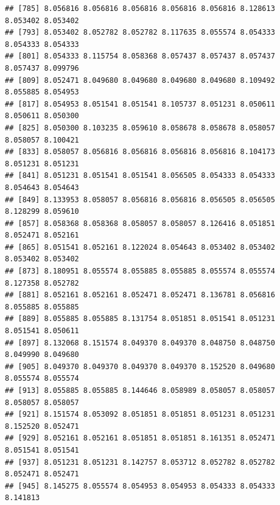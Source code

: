 \documentclass[
]{article}
\newenvironment{Shaded}{\begin{snugshade}}{\end{snugshade}}
\newcommand{\CommentTok}[1]{\textcolor[rgb]{0.56,0.35,0.01}{\textit{#1}}}
\newcommand{\DecValTok}[1]{\textcolor[rgb]{0.00,0.00,0.81}{#1}}
\newcommand{\FloatTok}[1]{\textcolor[rgb]{0.00,0.00,0.81}{#1}}
\newcommand{\FunctionTok}[1]{\textcolor[rgb]{0.00,0.00,0.00}{#1}}
\newcommand{\NormalTok}[1]{#1}
\newcommand{\OtherTok}[1]{\textcolor[rgb]{0.56,0.35,0.01}{#1}}
\newcommand{\SpecialCharTok}[1]{\textcolor[rgb]{0.00,0.00,0.00}{#1}}
\begin{document}
\begin{verbatim}
## [785] 8.056816 8.056816 8.056816 8.056816 8.056816 8.128613 8.053402 8.053402
## [793] 8.053402 8.052782 8.052782 8.117635 8.055574 8.054333 8.054333 8.054333
## [801] 8.054333 8.115754 8.058368 8.057437 8.057437 8.057437 8.057437 8.099796
## [809] 8.052471 8.049680 8.049680 8.049680 8.049680 8.109492 8.055885 8.054953
## [817] 8.054953 8.051541 8.051541 8.105737 8.051231 8.050611 8.050611 8.050300
## [825] 8.050300 8.103235 8.059610 8.058678 8.058678 8.058057 8.058057 8.100421
## [833] 8.058057 8.056816 8.056816 8.056816 8.056816 8.104173 8.051231 8.051231
## [841] 8.051231 8.051541 8.051541 8.056505 8.054333 8.054333 8.054643 8.054643
## [849] 8.133953 8.058057 8.056816 8.056816 8.056505 8.056505 8.128299 8.059610
## [857] 8.058368 8.058368 8.058057 8.058057 8.126416 8.051851 8.052471 8.052161
## [865] 8.051541 8.052161 8.122024 8.054643 8.053402 8.053402 8.053402 8.053402
## [873] 8.180951 8.055574 8.055885 8.055885 8.055574 8.055574 8.127358 8.052782
## [881] 8.052161 8.052161 8.052471 8.052471 8.136781 8.056816 8.055885 8.055885
## [889] 8.055885 8.055885 8.131754 8.051851 8.051541 8.051231 8.051541 8.050611
## [897] 8.132068 8.151574 8.049370 8.049370 8.048750 8.048750 8.049990 8.049680
## [905] 8.049370 8.049370 8.049370 8.049370 8.152520 8.049680 8.055574 8.055574
## [913] 8.055885 8.055885 8.144646 8.058989 8.058057 8.058057 8.058057 8.058057
## [921] 8.151574 8.053092 8.051851 8.051851 8.051231 8.051231 8.152520 8.052471
## [929] 8.052161 8.052161 8.051851 8.051851 8.161351 8.052471 8.051541 8.051541
## [937] 8.051231 8.051231 8.142757 8.053712 8.052782 8.052782 8.052471 8.052471
## [945] 8.145275 8.055574 8.054953 8.054953 8.054333 8.054333 8.141813
\end{verbatim}

\begin{Shaded}
\end{Shaded}
\end{document}
